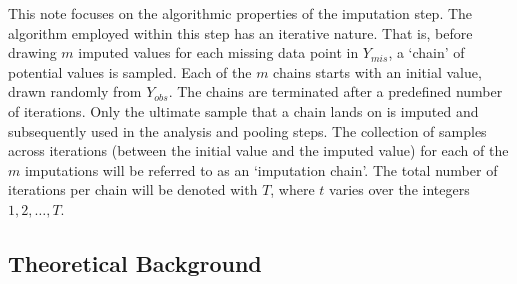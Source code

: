 \documentclass[article]{jss}
\begin{document}
This note focuses on the algorithmic properties of the imputation step. The algorithm employed within this step has an iterative nature. That is, before drawing $m$ imputed values for each missing data point in $Y_{mis}$, a `chain' of potential values is sampled. Each of the $m$ chains starts with an initial value, drawn randomly from $Y_{obs}$. The chains are terminated after a predefined number of iterations. Only the ultimate sample that a chain lands on is imputed and subsequently used in the analysis and pooling steps. The collection of samples across iterations (between the initial value and the imputed value) for each of the $m$ imputations will be referred to as an `imputation chain'. The total number of iterations per chain will be denoted with $T$, where $t$ varies over the integers $1, 2, \dots, T$.


% 
% 

\subsection{Theoretical Background} \label{sec:background}
\end{document}
